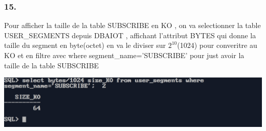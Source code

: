 \subsubsection*{15.}
Pour afficher la taille de la table SUBSCRIBE en KO , on va selectionner la table
USER\_SEGMENTS depuis DBAIOT , affichant l'attribut BYTES qui donne la taille du segment
en byte(octet) en va le diviser sur \(2^{10}\)(1024) pour converitre au KO et en filtre avec
where segment\_name='SUBSCRIBE' pour just avoir la taille de la table SUBSCRIBE



\begin{center}
    \includegraphics[width=\textwidth]{ScreenShot/Partie5/size.png}
\end{center}


